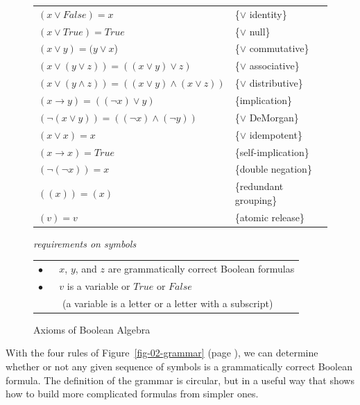 \begin{figure}
\begin{center}
\begin{tabular}{ll}
$(x \vee False) = x$                                     & \{$\vee$ identity\} \\
$(x \vee True) = True$                                   & \{$\vee$ null\} \\
$(x \vee y) = (y \vee x$)                                & \{$\vee$ commutative\} \\
$(x \vee (y \vee z)) = ((x \vee y) \vee z)$              & \{$\vee$ associative\} \\
$(x \vee (y \wedge z)) = ((x \vee y) \wedge (x \vee z))$ & \{$\vee$ distributive\} \\
$(x \rightarrow y) = ((\neg x) \vee y)$                  & \{implication\} \\
$(\neg(x \vee y)) = ((\neg x) \wedge (\neg y))$          & \{$\vee$ DeMorgan\} \\
$(x \vee x) = x$                                         & \{$\vee$ idempotent\} \\
$(x \rightarrow x) = True$                               & \{self-implication\} \\
$(\neg(\neg x))  = x$                                    & \{double negation\} \\
$((x)) = (x)$                                            & \{redundant grouping\} \\
$(v) = v$                                                & \{atomic release\} \\
\end{tabular}

\vspace{2 mm}

\emph{requirements on symbols}

\begin{tabular}{l}
\hline
$\bullet$ ~~ $x$, $y$, and $z$ are grammatically correct Boolean formulas \\
$\bullet$ ~~ $v$ is a variable or $True$ or $False$ \\
~~~~~(a variable is a letter or a letter with a subscript) \\
\hline
\end{tabular}
\end{center}
\caption{Axioms of Boolean Algebra}
\label{fig-02-boolean-axioms}
\end{figure}

With the four rules of 
Figure~\ref{fig-02-grammar} (page \pageref{fig-02-grammar}),
we can determine whether or not any given sequence of symbols 
is a grammatically correct Boolean formula.
The definition of the grammar is circular, 
but in a useful way that shows 
how to build more complicated formulas from simpler ones.

